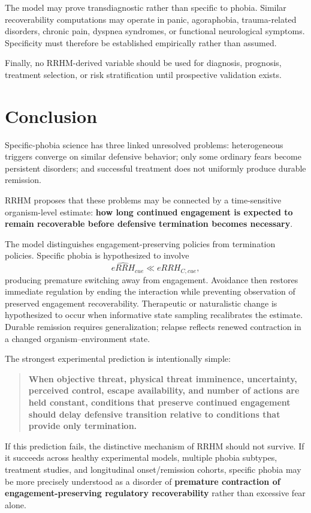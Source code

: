 \documentclass[11pt]{article}
\begin{document}
The model may prove transdiagnostic rather than specific to phobia. Similar recoverability computations may operate in panic, agoraphobia, trauma-related disorders, chronic pain, dyspnea syndromes, or functional neurological symptoms. Specificity must therefore be established empirically rather than assumed.

Finally, no RRHM-derived variable should be used for diagnosis, prognosis, treatment selection, or risk stratification until prospective validation exists.

\section{Conclusion}
Specific-phobia science has three linked unresolved problems: heterogeneous triggers converge on similar defensive behavior; only some ordinary fears become persistent disorders; and successful treatment does not uniformly produce durable remission.

RRHM proposes that these problems may be connected by a time-sensitive organism-level estimate: \textbf{how long continued engagement is expected to remain recoverable before defensive termination becomes necessary}.

The model distinguishes engagement-preserving policies from termination policies. Specific phobia is hypothesized to involve
\[
\widehat{eRRH}_{cue}\ll eRRH_{C,cue},
\]
producing premature switching away from engagement. Avoidance then restores immediate regulation by ending the interaction while preventing observation of preserved engagement recoverability. Therapeutic or naturalistic change is hypothesized to occur when informative state sampling recalibrates the estimate. Durable remission requires generalization; relapse reflects renewed contraction in a changed organism--environment state.

The strongest experimental prediction is intentionally simple:
\begin{quote}
\textbf{When objective threat, physical threat imminence, uncertainty, perceived control, escape availability, and number of actions are held constant, conditions that preserve continued engagement should delay defensive transition relative to conditions that provide only termination.}
\end{quote}

If this prediction fails, the distinctive mechanism of RRHM should not survive. If it succeeds across healthy experimental models, multiple phobia subtypes, treatment studies, and longitudinal onset/remission cohorts, specific phobia may be more precisely understood as a disorder of \textbf{premature contraction of engagement-preserving regulatory recoverability} rather than excessive fear alone.
\end{document}
